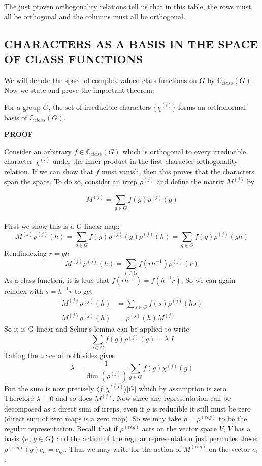 \documentclass[9 pt]{report}
\begin{document}
The just proven orthogonality relations tell us that in this table, the rows must all be orthogonal and the columns must all be orthogonal. 

\pagebreak

{\centering
\subsection*{CHARACTERS AS A BASIS IN THE SPACE OF CLASS FUNCTIONS}}

We will denote the space of complex-valued class functions on $G$ by $\mathbb{C}_{class}(G)$. Now we state and prove the important theorem:

\begin{tcolorbox}
	For a group $G$, the set of irreducible characters $\{\chi^{(i)}\}$ forms an orthonormal basis of $\mathbb{C}_{class}(G)$.
\end{tcolorbox}

\begin{center}
	\textbf{PROOF}
\end{center}

Consider an arbitrary $f \in \mathbb{C}_{class}(G)$ which is orthogonal to every irreducible character $\chi^{(i)}$ under the inner product in the first character orthogonality relation. If we can show that $f$ must vanish, then this proves that the characters span the space. To do so, consider an irrep $\rho^{(j)}$ and define the matrix $M^{(j)}$ by

$$ M^{(j)} = \sum_{g\in G}f(g)\rho^{(j)}(g) $$
\\
First we show this is a G-linear map:
$$ M^{(j)}\rho^{(j)}(h) = \sum_{g\in G}f(g)\rho^{(j)}(g)\rho^{(j)}(h) = \sum_{g\in G}f(g)\rho^{(j)}(gh) $$
Rendindexing $r=gh$
$$ M^{(j)}\rho^{(j)}(h) = \sum_{r\in G}f(rh^{-1})\rho^{(j)}(r) $$
As a class function, it is true that $f(rh^{-1}) = f(h^{-1}r)$. So we can again reindex with $s=h^{-1}r$ to get
\begin{align}
	M^{(j)}\rho^{(j)}(h) &= \sum_{s\in G}f(s)\rho^{(j)}(hs)\nonumber \\
  M^{(j)}\rho^{(j)}(h) &= \rho^{(j)}(h)M^{(j)}
  \nonumber 
\end{align}
So it is G-linear and Schur's lemma can be applied to write
$$ \sum_{g\in G} f(g)\rho^{(j)}(g) = \lambda \;I $$
Taking the trace of both sides gives
$$ \lambda = \frac{1}{\dim(\rho^{(j)})}\sum_{g\in G}f(g)\chi^{(j)}(g)  $$
But the sum is now precisely $\langle f, \chi^{*(j)} \rangle |G|$ which by assumption is zero. Therefore $\lambda=0$ and so does $M^{(j)}$. Now since any representation can be decomposed as a direct sum of irreps, even if $\rho$ is reducible it still must be zero (direct sum of zero maps is a zero map). So we may take $\rho=\rho^{(reg)}$ to be the regular representation. Recall that if $\rho^{(reg)}$ acts on the vector space $V$, $V$ has a basis $\{e_g | g\in G\}$ and the action of the regular representation just permutes these: $\rho^{(reg)}(g)e_h = e_{gh}$. Thus we may write for the action of $M^{(reg)}$ on the vector $e_1$:
\end{document}
